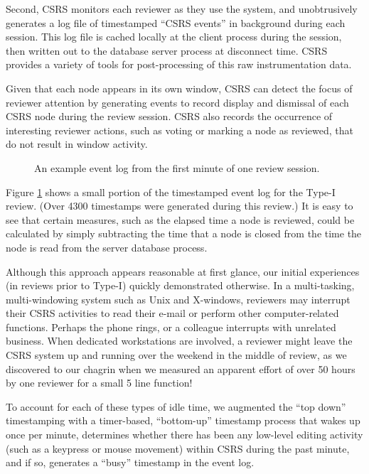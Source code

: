 Second, CSRS monitors each reviewer as they use the system, and
unobtrusively generates a log file of timestamped ``CSRS events'' in
background during each session. This log file is cached locally at the
client process during the session, then written out to the database server
process at disconnect time.  CSRS provides a variety of tools for
post-processing of this raw instrumentation data.

Given that each node appears in its own window, CSRS can detect the focus
of reviewer attention by generating events to record display and dismissal
of each CSRS node during the review session.  CSRS also records the
occurrence of interesting reviewer actions, such as voting or marking a
node as reviewed, that do not result in window activity.

\begin{figure} 
 {\centerline{}}
 \caption{An example event log from the first minute of one review session.}
\label{fig:event-log}
\end{figure}

Figure \ref{fig:event-log} shows a small portion of the timestamped event
log for the Type-I review. (Over 4300 timestamps were generated during
this review.)  It is easy to see that certain measures, such as the
elapsed time a node is reviewed, could be calculated by simply subtracting
the time that a node is closed from the time the node is read from the
server database process.

Although this approach appears reasonable at first glance, our initial
experiences (in reviews prior to Type-I) quickly demonstrated otherwise.
In a multi-tasking, multi-windowing system such as Unix and X-windows,
reviewers may interrupt their CSRS activities to read their e-mail or
perform other computer-related functions.  Perhaps the phone rings, or a
colleague interrupts with unrelated business.  When dedicated workstations
are involved, a reviewer might leave the CSRS system up and running over
the weekend in the middle of review, as we discovered to our chagrin when
we measured an apparent effort of over 50 hours by one reviewer for a small
5 line function!

To account for each of these types of idle time, we augmented the ``top
down'' timestamping with a timer-based, ``bottom-up'' timestamp process
that wakes up once per minute, determines whether there has been any
low-level editing activity (such as a keypress or mouse movement) within
CSRS during the past minute, and if so, generates a ``busy'' timestamp in
the event log. 

